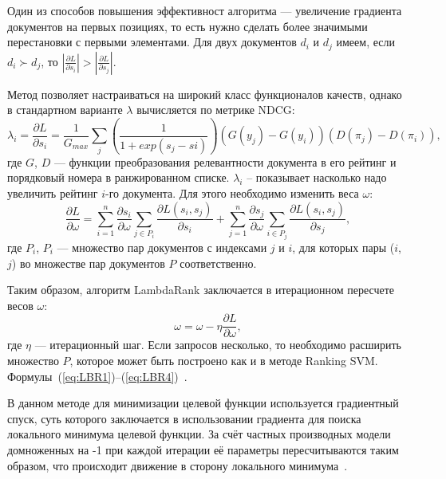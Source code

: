 Один из способов повышения эффективност алгоритма  --- увеличение градиента документов на первых позициях, то есть нужно сделать более значимыми  перестановки с первыми элементами. Для двух документов $d_{i}$ и $d_{j}$ имеем, если $d_{i} \succ d_{j}$, то $| \frac{\partial L}{\partial s_{i}} | > | \frac{\partial L}{\partial s_{j}} |$.

Метод позволяет настраиваться на широкий класс функционалов качеств, однако в стандартном варианте $\lambda$ вычисляется по метрике NDCG:
\begin{equation}
	\label{eq:LBR2}
	\lambda_{i} = \frac{\partial L}{\partial s_{i}} = \frac{1}{G_{max}} \sum_{j}(\frac{1}{1 + exp(s_{j} - s{i})})(G(y_{j}) - G(y_{i}))(D(\pi_{j}) - D(\pi_{i})),
\end{equation}
где  $G$, $D$ ---  функции преобразования релевантности документа в его рейтинг и порядковый номера  в ранжированном списке.  $\lambda_{i}$ – показывает насколько надо увеличить рейтинг $i$-го документа. Для этого необходимо изменить веса $\omega$:
\begin{equation}
	\label{eq:LBR3}
	\frac{\partial L}{\partial \omega} = \sum_{i=1}^{n}\frac{\partial s_{i}}{\partial \omega}\sum_{j \in P_{i}}\frac{\partial L(s_{i}, s_{j})}{\partial s_{i}} + \sum_{j=1}^{n}\frac{\partial s_{j}}{\partial \omega}\sum_{i \in P_{j}}\frac{\partial L(s_{i}, s_{j})}{\partial s_{j}},
\end{equation}
где $P_{i}$, $P_{i}$ --- множество пар документов с индексами $j$ и $i$, для которых пары ($i$, $j$) во множестве пар документов $P$ соответственно.

Таким образом, алгоритм LambdaRank заключается в итерационном пересчете весов $\omega$:
\begin{equation}
	\label{eq:LBR4}
	\omega = \omega - \eta\frac{\partial L}{\partial \omega},
\end{equation}
где $\eta$ --- итерационный шаг. Если запросов несколько, то необходимо расширить множество $P$, которое может быть построено как и в методе Ranking SVM. Формулы~(\ref{eq:LBR1})--(\ref{eq:LBR4})~\cite{LamdaRank}.

В данном методе для минимизации целевой функции используется градиентный спуск, суть которого заключается в использовании градиента для поиска локального минимума целевой функции. За счёт частных производных модели домноженных на -1 при каждой итерации её параметры пересчитываются таким образом, что происходит движение в сторону локального минимума~\cite{ML_no_wors}.

